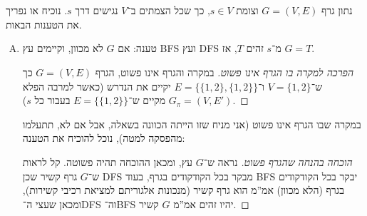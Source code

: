 \documentclass[]{../../../../tex/classes/homework}
\begin{document}
	\npage
	
	\section{}
	נתון גרף $G = (V, E)$ וצומת $s \in V$, כך שכל הצמתים ב־$V$ נגישים דרך $s$. נוכיח או נפריך את הטענות הבאות. 
	\begin{enumerate}[(A)]
		\item טענה: אם $G$ לא מכוון, וקיימים עץ BFS ועץ DFS מ־$s$ זהים $T$, אז $G = T$.
		\begin{proof}[הפרכה למקרה בו הגרף אינו פשוט]
			במקרה והגרף אינו פשוט, הגרף $G = (V, E)$ כך ש־$V = \{1, 2\}$ ו־$E = \{\{1, 2\}, \{1, 2\}\}$ יקיים את הנדרש (כאשר למרבה הפלא $G_{\pi}  = (V, E')$ מקיים ש־$E = \{\{1, 2\}\}$ בעבור כל $s$). 
		\end{proof}
		במקרה שבו הגרף אינו פשוט (אני מניח שזו הייתה הכוונה בשאלה, אבל אם לא, תתעלמו מהפסקה למטה), נוכל להוכיח את הטענה:
		 \begin{proof}[הוכחה בהנחה שהגרף פשוט]
			נראה ש־$G$ עץ, ומכאן ההוכחה תהיה פשוטה. קל לראות ש־$G$ גרף קשיר שכן DFS מבקר בכל הקודקודים בגרף, בעוד BFS יבקר בכל הקודקודים בגרף (הלא מכוון) אמ''מ הוא גרף קשיר (מנכונות אלגוריתם למציאת רכיבי קשירות), ומכאן שעצי ה־DFS וה־BFS יהיו זהים אמ''מ $G$ קשיר. 
			

\end{proof}
\end{enumerate}
\end{document}
